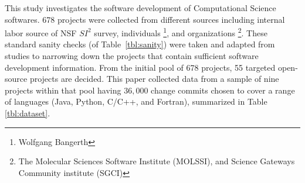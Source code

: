 \documentclass[sigconf,review, anonymous]{acmart}
\newcommand{\bi}{\begin{itemize}[leftmargin=0.4cm]}
\newcommand{\ei}{\end{itemize}}
\begin{document}
This study investigates the software development of Computational Science softwares.  678 projects were collected from different sources including internal labor source of NSF $SI^2$ survey, individuals \footnote{Wolfgang Bangerth}, and organizations \footnote{The Molecular Sciences Software Institute (MOLSSI), and Science Gateways Community institute (SGCI)}. These standard sanity checks (of Table~\ref{tbl:sanity}) were taken and adapted from studies \cite{bird09promise,agrawal2018we, eirini15promise, munaiah17curating} to narrowing down the projects that contain sufficient software development information. From the initial pool of 678 projects, 55 targeted open-source projects are decided. This paper collected data from a sample of nine projects within that pool having $36,000$ change commits chosen to cover a range of languages (Java, Python, C/C++, and Fortran), summarized in Table \ref{tbl:dataset}.



\end{document}
